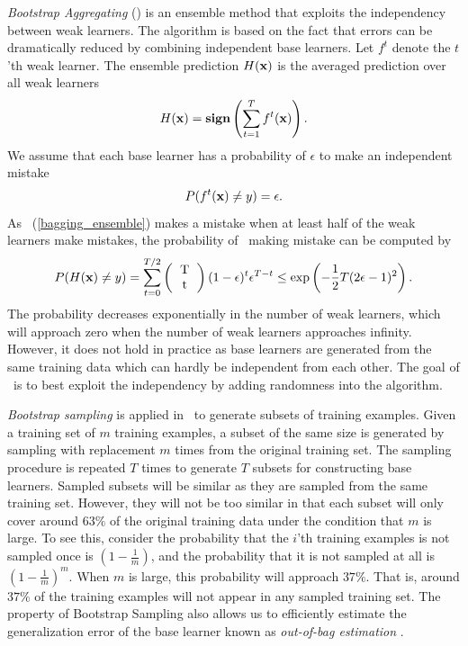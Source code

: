 {\textit{Bootstrap Aggregating} (\bagging) \citep{Breiman96bagging} is an ensemble method that exploits the independency between weak learners.
The algorithm is based on the fact that errors can be dramatically reduced by combining independent base learners.
Let $f^t$ denote the $t$'th weak learner.
The ensemble prediction $H(\mathbf {x})$ is the averaged prediction over all weak learners
\begin{align}
	H(\mathbf {x}) = \textbf{sign}\left(\sum_{t=1}^{T}f^t(\mathbf {x})\right). \label{bagging_ensemble}
\end{align}
We assume that each base learner has a probability of $\epsilon$ to make an independent mistake
\begin{align*}
	P(f^t(\mathbf {x}) \ne y) = \epsilon.
\end{align*}
As \bagging\ (\ref{bagging_ensemble}) makes a mistake when at least half of the weak learners make mistakes, the probability of \bagging\ making mistake can be computed by
\begin{align*}
	P(H(\vx)\neq y) = \sum_{t=0}^{T/2}\left(\begin{tabular}{cc}T\\t\end{tabular}\right)(1-\epsilon)^t\epsilon^{T-t} \le\exp\left(-\frac{1}{2}T(2\epsilon-1)^2\right).
\end{align*}
The probability decreases exponentially in the number of weak learners, which will approach zero when the number of weak learners approaches infinity.
However, it does not hold in practice as base learners are generated from the same training data which can hardly be independent from each other.
The goal of \bagging\ is to best exploit the independency by adding randomness into the algorithm.

\textit{Bootstrap sampling} \citep{Efron1994introduction} is applied in \bagging\ to generate subsets of training examples.
Given a training set of $m$ training examples, a subset of the same size is generated by sampling with replacement $m$ times from the original training set.
The sampling procedure is repeated $T$ times to generate $T$ subsets for constructing base learners.
Sampled subsets will be similar as they are sampled from the same training set.
However, they will not be too similar in that each subset will only cover around $63\%$ of the original training data under the condition that $m$ is large.
To see this, consider the probability that the $i$'th training examples is not sampled once is $(1-\frac{1}{m})$, and the probability that it is not sampled at all is $(1-\frac{1}{m})^m$.
When $m$ is large, this probability will approach $37\%$. 
That is, around $37\%$ of the training examples will not appear in any sampled training set.
The property of Bootstrap Sampling also allows us to efficiently estimate the generalization error of the base learner known as \textit{out-of-bag estimation} \citep{Breiman96out,Tibshirani1996bias,Wolpert99an}.

}
